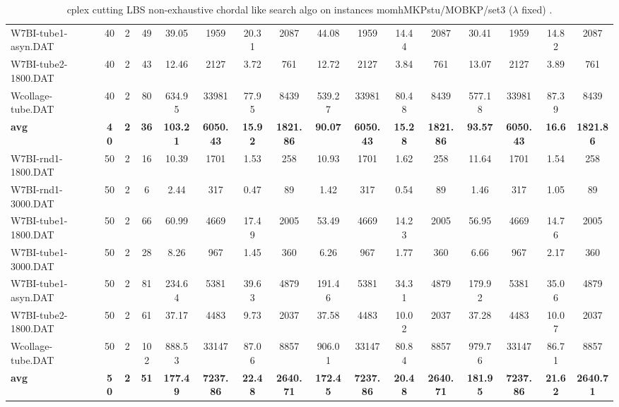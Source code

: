 \begin{sidewaystable}[!ht]
{\begin{tabular}{lccccccccccccccc}
W7BI-tube1-asyn.DAT & 40 & 2 & 49 & 39.05 & 1959 & 20.31 & 2087 & 44.08 & 1959 &  \textcolor{blue2}{14.44} & 2087 & 30.41 & 1959 & 14.82 & 2087 \\
W7BI-tube2-1800.DAT & 40 & 2 & 43 & 12.46 & 2127 &  \textcolor{blue2}{3.72} & 761 & 12.72 & 2127 & 3.84 & 761 & 13.07 & 2127 & 3.89 & 761 \\
Wcollage-tube.DAT & 40 & 2 & 80 & 634.95 & 33981 &  \textcolor{blue2}{77.95} & 8439 & 539.27 & 33981 & 80.48 & 8439 & 577.18 & 33981 & 87.39 & 8439 \\
\cline{1-16} \textbf{avg} & \textbf{40} & \textbf{2} & \textbf{36} & \textbf{103.21} & \textbf{6050.43} & \textbf{15.92} & \textbf{1821.86} & \textbf{90.07} & \textbf{6050.43} & \textbf{15.28} & \textbf{1821.86} & \textbf{93.57} & \textbf{6050.43} & \textbf{16.6} & \textbf{1821.86} \\ \cline{1-16}
W7BI-rnd1-1800.DAT & 50 & 2 & 16 & 10.39 & 1701 &  \textcolor{blue2}{1.53} & 258 & 10.93 & 1701 & 1.62 & 258 & 11.64 & 1701 & 1.54 & 258 \\
W7BI-rnd1-3000.DAT & 50 & 2 & 6 & 2.44 & 317 &  \textcolor{blue2}{0.47} & 89 & 1.42 & 317 & 0.54 & 89 & 1.46 & 317 & 1.05 & 89 \\
W7BI-tube1-1800.DAT & 50 & 2 & 66 & 60.99 & 4669 & 17.49 & 2005 & 53.49 & 4669 &  \textcolor{blue2}{14.23} & 2005 & 56.95 & 4669 & 14.76 & 2005 \\
W7BI-tube1-3000.DAT & 50 & 2 & 28 & 8.26 & 967 &  \textcolor{blue2}{1.45} & 360 & 6.26 & 967 & 1.77 & 360 & 6.66 & 967 & 2.17 & 360 \\
W7BI-tube1-asyn.DAT & 50 & 2 & 81 & 234.64 & 5381 & 39.63 & 4879 & 191.46 & 5381 &  \textcolor{blue2}{34.31} & 4879 & 179.92 & 5381 & 35.06 & 4879 \\
W7BI-tube2-1800.DAT & 50 & 2 & 61 & 37.17 & 4483 &  \textcolor{blue2}{9.73} & 2037 & 37.58 & 4483 & 10.02 & 2037 & 37.28 & 4483 & 10.07 & 2037 \\
Wcollage-tube.DAT & 50 & 2 & 102 & 888.53 & 33147 & 87.06 & 8857 & 906.01 & 33147 &  \textcolor{blue2}{80.84} & 8857 & 979.76 & 33147 & 86.71 & 8857 \\
\cline{1-16} \textbf{avg} & \textbf{50} & \textbf{2} & \textbf{51} & \textbf{177.49} & \textbf{7237.86} & \textbf{22.48} & \textbf{2640.71} & \textbf{172.45} & \textbf{7237.86} & \textbf{20.48} & \textbf{2640.71} & \textbf{181.95} & \textbf{7237.86} & \textbf{21.62} & \textbf{2640.71} \\ \cline{1-16}
\bottomrule
\end{tabular}
}%
\caption{cplex cutting LBS non-exhaustive chordal like search algo on instances momhMKPstu/MOBKP/set3 ($\lambda$ fixed) .}
\label{tab:table_lambda_chordal_momhMKPstu/MOBKP/set3 }
\end{sidewaystable}
